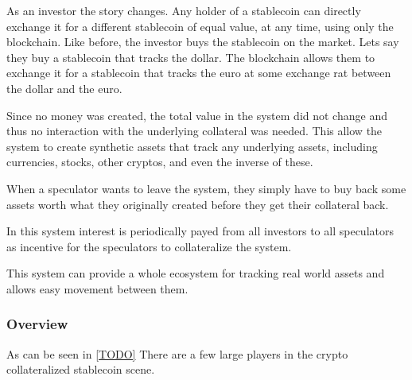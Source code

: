 \documentclass[english,]{IEEEtran}
\begin{document}
As an investor the story changes. Any holder of a stablecoin can
directly exchange it for a different stablecoin of equal value, at any
time, using only the blockchain. Like before, the investor buys the
stablecoin on the market. Lets say they buy a stablecoin that tracks the
dollar. The blockchain allows them to exchange it for a stablecoin that
tracks the euro at some exchange rat between the dollar and the euro.

Since no money was created, the total value in the system did not change
and thus no interaction with the underlying collateral was needed. This
allow the system to create synthetic assets that track any underlying
assets, including currencies, stocks, other cryptos, and even the
inverse of these.

When a speculator wants to leave the system, they simply have to buy
back some assets worth what they originally created before they get
their collateral back.

In this system interest is periodically payed from all investors to all
speculators as incentive for the speculators to collateralize the
system.

This system can provide a whole ecosystem for tracking real world assets
and allows easy movement between them.

\subsubsection{Overview}\label{overview}

As can be seen in \ref{TODO} There are a few large players in the crypto
collateralized stablecoin scene.
\end{document}
